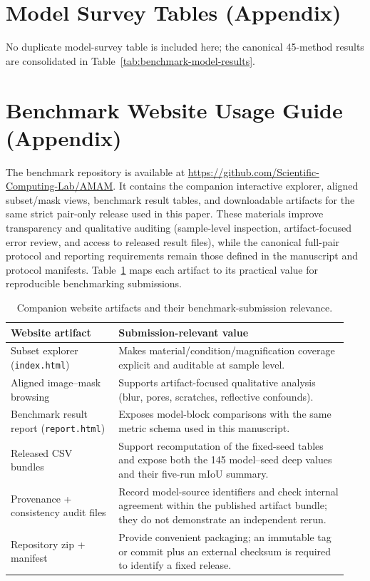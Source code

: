 \documentclass{article}
\newcommand{\tablefontsize}{\small}
\begin{document}
\section{Model Survey Tables (Appendix)}\label{app:modelsurvey}
No duplicate model-survey table is included here; the canonical 45-method
results are consolidated in Table~\ref{tab:benchmark-model-results}.

\section{Benchmark Website Usage Guide (Appendix)}\label{app:website}
The benchmark repository is available at
\url{https://github.com/Scientific-Computing-Lab/AMAM}. It contains the
companion interactive explorer, aligned subset/mask views, benchmark result
tables, and downloadable artifacts for the same strict pair-only release used
in this paper. These materials improve transparency and qualitative auditing
(sample-level inspection, artifact-focused error review, and access to released
result files), while the canonical full-pair protocol and reporting
requirements remain those defined in the manuscript and protocol manifests.
Table~\ref{tab:website_artifacts} maps each artifact to its practical value for
reproducible benchmarking submissions.

\begin{table}[ht]
    \centering
    \tablefontsize
    \caption{Companion website artifacts and their benchmark-submission relevance.}
    \label{tab:website_artifacts}
    \begin{tabular}{>{\raggedright\arraybackslash}p{0.30\linewidth}>{\raggedright\arraybackslash}p{0.64\linewidth}}
        \toprule
        Website artifact & Submission-relevant value \\
        \midrule
        Subset explorer (\texttt{index.html}) & Makes material/condition/magnification coverage explicit and auditable at sample level. \\
        Aligned image--mask browsing & Supports artifact-focused qualitative analysis (blur, pores, scratches, reflective confounds). \\
        Benchmark result report (\texttt{report.html}) & Exposes model-block comparisons with the same metric schema used in this manuscript. \\
        Released CSV bundles & Support recomputation of the fixed-seed tables and expose both the 145 model--seed deep values and their five-run mIoU summary. \\
        Provenance + consistency audit files & Record model-source identifiers and check internal agreement within the published artifact bundle; they do not demonstrate an independent rerun. \\
        Repository zip + manifest & Provide convenient packaging; an immutable tag or commit plus an external checksum is required to identify a fixed release. \\
        \bottomrule
    \end{tabular}
\end{table}
\end{document}
